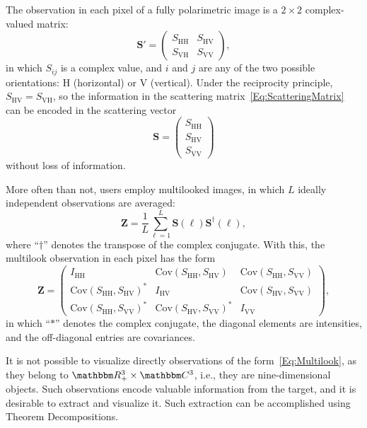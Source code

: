 \documentclass{article}
\begin{document}
    The observation in each pixel of a fully polarimetric image is a $2\times2$ complex-valued matrix:
    \begin{equation}
    \bm S' = \begin{pmatrix}
    	S_{\text{HH}} & S_{\text{HV}}\\
    	S_{\text{VH}} & S_{\text{VV}}
    \end{pmatrix}, \label{Eq:ScatteringMatrix}
    \end{equation}
    in which $S_{ij}$ is a complex value, and $i$ and $j$ are any of the two possible orientations: $\text{H}$ (horizontal) or $\text{V}$ (vertical).
    Under the reciprocity principle, $S_{\text{HV}}=S_{\text{VH}}$, so the information in the scattering matrix~\eqref{Eq:ScatteringMatrix} can be encoded in the scattering vector
    \begin{equation}
    \bm S = \begin{pmatrix}
    	S_{\text{HH}}\\
    	S_{\text{HV}}\\
    	S_{\text{VV}}
    \end{pmatrix}
    \end{equation}
    without loss of information.
    
    More often than not, users employ multilooked images, in which $L$ ideally independent observations are averaged:
    \begin{equation}
    \bm Z = \frac{1}{L} \sum_{\ell=1}^L \bm S(\ell) \bm S^\dag(\ell),
    \end{equation}
    where ``$\dag$'' denotes the transpose of the complex conjugate.
    With this, the multilook observation in each pixel has the form
    \begin{equation}
    \bm Z = \begin{pmatrix}
    I_{\text{HH}} & \text{Cov}(S_{\text{HH}},S_\text{HV}) & \text{Cov}(S_{\text{HH}},S_\text{VV}) \\
    \text{Cov}(S_{\text{HH}},S_\text{HV})^* & I_{\text{HV}} & \text{Cov}(S_{\text{HV}},S_\text{VV})\\
    \text{Cov}(S_{\text{HH}},S_\text{VV})^* & \text{Cov}(S_{\text{HV}},S_\text{VV})^* & I_{\text{VV}}
    \end{pmatrix},
    \label{Eq:Multilook}
    \end{equation}
    in which ``$*$'' denotes the complex conjugate, the diagonal elements are intensities, and the off-diagonal entries are covariances.
    
    It is not possible to visualize directly observations of the form~\eqref{Eq:Multilook}, as they belong to $\mathbbm R_+^3\times \mathbbm C^3$, i.e., they are nine-dimensional objects.
    Such observations encode valuable information from the target, and it is desirable to extract and visualize it.
    Such extraction can be accomplished using Theorem Decompositions.
    
\end{document}
